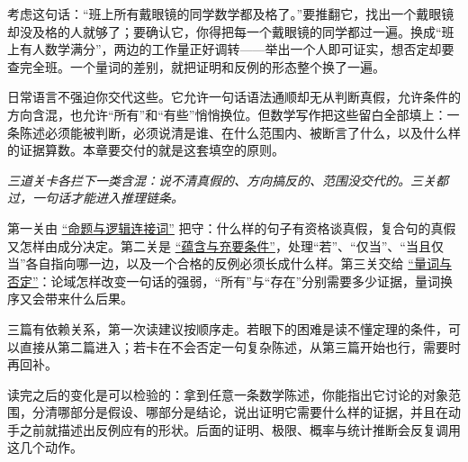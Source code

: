 考虑这句话：``班上所有戴眼镜的同学数学都及格了。''要推翻它，找出一个戴眼镜却没及格的人就够了；要确认它，你得把每一个戴眼镜的同学都过一遍。换成``班上有人数学满分''，两边的工作量正好调转——举出一个人即可证实，想否定却要查完全班。一个量词的差别，就把证明和反例的形态整个换了一遍。

日常语言不强迫你交代这些。它允许一句话语法通顺却无从判断真假，允许条件的方向含混，也允许``所有''和``有些''悄悄换位。但数学写作把这些留白全部填上：一条陈述必须能被判断，必须说清是谁、在什么范围内、被断言了什么，以及什么样的证据算数。本章要交付的就是这套填空的原则。

\begin{center}

\emph{三道关卡各拦下一类含混：说不清真假的、方向搞反的、范围没交代的。三关都过，一句话才能进入推理链条。}
\end{center}

第一关由 \hyperref[sec:01-Mathematical-Language/01-Logic/01]{``命题与逻辑连接词''} 把守：什么样的句子有资格谈真假，复合句的真假又怎样由成分决定。第二关是 \hyperref[sec:01-Mathematical-Language/01-Logic/02]{``蕴含与充要条件''}，处理``若''、``仅当''、``当且仅当''各自指向哪一边，以及一个合格的反例必须长成什么样。第三关交给 \hyperref[sec:01-Mathematical-Language/01-Logic/03]{``量词与否定''}：论域怎样改变一句话的强弱，``所有''与``存在''分别需要多少证据，量词换序又会带来什么后果。

三篇有依赖关系，第一次读建议按顺序走。若眼下的困难是读不懂定理的条件，可以直接从第二篇进入；若卡在不会否定一句复杂陈述，从第三篇开始也行，需要时再回补。

读完之后的变化是可以检验的：拿到任意一条数学陈述，你能指出它讨论的对象范围，分清哪部分是假设、哪部分是结论，说出证明它需要什么样的证据，并且在动手之前就描述出反例应有的形状。后面的证明、极限、概率与统计推断会反复调用这几个动作。
